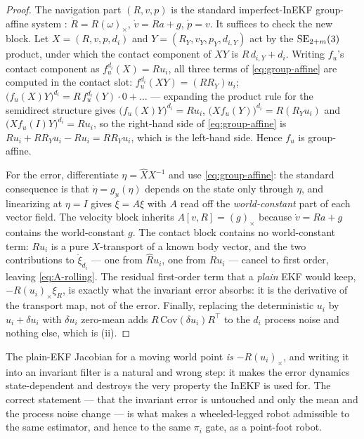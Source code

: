 \begin{proof}
The navigation part $(R, v, p)$ is the standard imperfect-InEKF group-affine
system \cite{barrau2017invariant}: $\dot R = R(\omega)_\times$,
$\dot v = R a + g$, $\dot p = v$. It suffices to check the new block. Let
$X = (R, v, p, d_i)$ and $Y = (R_Y, v_Y, p_Y, d_{i,Y})$ act by the
$\mathrm{SE}_{2+m}(3)$ product, under which the contact component of $XY$ is
$R\,d_{i,Y} + d_i$. Writing $f_u$'s contact component as
$f_u^{d_i}(X) = R u_i$, all three terms of \eqref{eq:group-affine} are computed
in the contact slot:
$f_u^{d_i}(XY) = (R R_Y) u_i$;
$\bigl(f_u(X) Y\bigr)^{d_i} = R\,f^{d_i}_u(Y) \cdot 0 + \dots$ --- expanding
the product rule for the semidirect structure gives
$\bigl(f_u(X)Y\bigr)^{d_i} = R u_i$,
$\bigl(X f_u(Y)\bigr)^{d_i} = R (R_Y u_i)$ and
$\bigl(X f_u(I) Y\bigr)^{d_i} = R u_i$, so the right-hand side of
\eqref{eq:group-affine} is $R u_i + R R_Y u_i - R u_i = R R_Y u_i$, which is
the left-hand side. Hence $f_u$ is group-affine.

For the error, differentiate $\eta = \hat X X^{-1}$ and use
\eqref{eq:group-affine}: the standard consequence
\cite[Thm.~1]{barrau2017invariant} is that
$\dot\eta = g_u(\eta)$ depends on the state only through $\eta$, and
linearizing at $\eta = I$ gives $\dot\xi = A\xi$ with $A$ read off the
\emph{world-constant} part of each vector field. The velocity block inherits
$A[v, R] = (g)_\times$ because $\dot v = Ra + g$ contains the world-constant
$g$. The contact block contains no world-constant term: $R u_i$ is a pure
$X$-transport of a known body vector, and the two contributions to
$\dot\xi_{d_i}$ --- one from $\hat R u_i$, one from $R u_i$ --- cancel to first
order, leaving \eqref{eq:A-rolling}. The residual first-order term that a
\emph{plain} EKF would keep, $-R(u_i)_\times \xi_R$, is exactly what the
invariant error absorbs: it is the derivative of the transport map, not of the
error. Finally, replacing the deterministic $u_i$ by
$u_i + \delta u_i$ with $\delta u_i$ zero-mean adds $R\,\mathrm{Cov}(\delta u_i)R^\top$
to the $d_i$ process noise and nothing else, which is (ii).
\end{proof}

\begin{remark}
The plain-EKF Jacobian for a moving world point \emph{is}
$-R(u_i)_\times$, and writing it into an invariant filter is a natural and
wrong step: it makes the error dynamics state-dependent and destroys the very
property the InEKF is used for. The correct statement --- that the invariant
error is untouched and only the mean and the process noise change --- is what
makes a wheeled-legged robot admissible to the same estimator, and hence to
the same $\pi_i$ gate, as a point-foot robot.
\end{remark}

